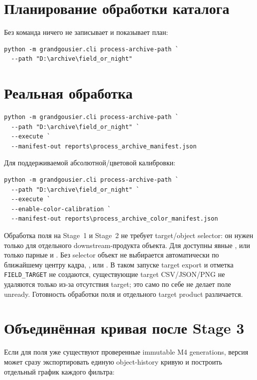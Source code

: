 \section{Планирование обработки каталога}

Без  команда ничего не записывает и показывает план:

\begin{lstlisting}
python -m grandgousier.cli process-archive-path `
  --path "D:\archive\field_or_night"
\end{lstlisting}

\section{Реальная обработка}

\begin{lstlisting}
python -m grandgousier.cli process-archive-path `
  --path "D:\archive\field_or_night" `
  --execute `
  --manifest-out reports\process_archive_manifest.json
\end{lstlisting}

Для поддерживаемой абсолютной/цветовой калибровки:

\begin{lstlisting}
python -m grandgousier.cli process-archive-path `
  --path "D:\archive\field_or_night" `
  --execute `
  --enable-color-calibration `
  --manifest-out reports\process_archive_color_manifest.json
\end{lstlisting}

Обработка поля на Stage~1 и Stage~2 не требует target/object selector: он нужен только для отдельного downstream-продукта объекта. Для  доступны явные ,  или только парные  и . Без selector объект не выбирается автоматически по ближайшему центру кадра, ,  или . В таком запуске target export и отметка \texttt{FIELD\_TARGET} не создаются, существующие target CSV/JSON/PNG не удаляются только из-за отсутствия target; это само по себе не делает поле unready. Готовность обработки поля и отдельного target product различается.


\section{Объединённая кривая после Stage 3}

Если для поля уже существуют проверенные immutable M4 generations, версия \manualversion{} может сразу экспортировать единую object-history кривую и построить отдельный график каждого фильтра:

